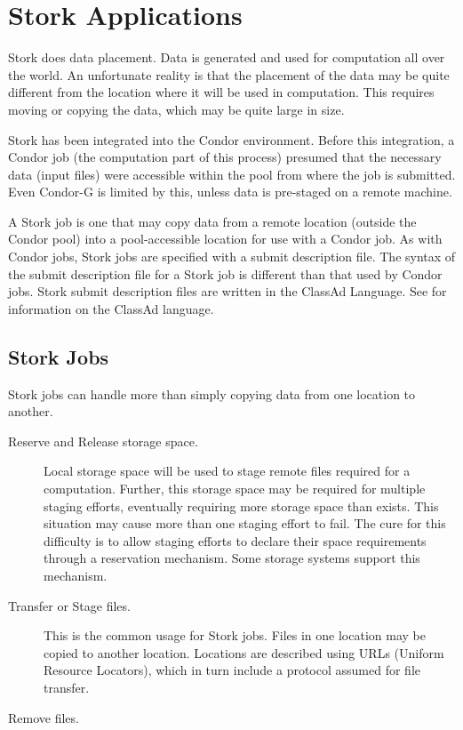\section{\label{sec:Stork}Stork Applications}

Stork does data placement.
Data is generated and used for computation all over the world.
An unfortunate reality is that the placement of the data
may be quite different from the location where it will be used
in computation.
This requires moving or copying the data, 
which may be quite large in size.

Stork has been integrated into the Condor environment.
Before this integration,
a Condor job (the computation part of this process)
presumed that the necessary data (input files) were
accessible within the pool from where the job is submitted.
Even Condor-G is limited by this, unless data is 
pre-staged on a remote machine.

A Stork job is one that may copy data from a remote
location (outside the Condor pool) into a pool-accessible
location for use with a Condor job.
As with Condor jobs, Stork jobs are specified with
a submit description file.
The syntax of the submit description file for a Stork
job is different than that used by Condor jobs.
Stork submit description files are written in
the ClassAd Language.
See  for information
on the ClassAd language.

\subsection{\label{sec:Stork-Job-Submission}Stork Jobs}

Stork jobs can handle more than simply copying data
from one location to another.

\begin{description}
\item [Reserve and Release storage space.]
  Local storage space will be used to stage remote files required for
  a computation.
  Further, this storage space may be required for multiple
  staging efforts,
  eventually requiring more storage space than exists.
  This situation may cause more than one staging effort to
  fail.
  The cure for this difficulty is to allow staging efforts
  to declare their space requirements through a reservation
  mechanism.
  Some storage systems support this mechanism.

\item [Transfer or Stage files.]
  This is the common usage for Stork jobs.
  Files in one location may be copied to another location.
  Locations are described using URLs (Uniform Resource Locators),
  which in turn include a protocol assumed for file transfer.

\item [Remove files.]
\end{description}

